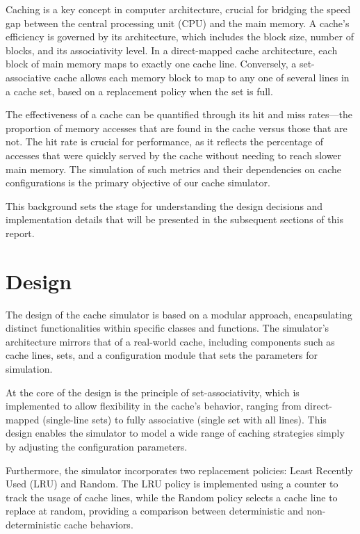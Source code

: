 \documentclass[12pt]{article}
\begin{document}
Caching is a key concept in computer architecture, crucial for bridging the speed gap between the central processing unit (CPU) and the main memory. A cache's efficiency is governed by its architecture, which includes the block size, number of blocks, and its associativity level. In a direct-mapped cache architecture, each block of main memory maps to exactly one cache line. Conversely, a set-associative cache allows each memory block to map to any one of several lines in a cache set, based on a replacement policy when the set is full.

The effectiveness of a cache can be quantified through its hit and miss rates—the proportion of memory accesses that are found in the cache versus those that are not. The hit rate is crucial for performance, as it reflects the percentage of accesses that were quickly served by the cache without needing to reach slower main memory. The simulation of such metrics and their dependencies on cache configurations is the primary objective of our cache simulator.

This background sets the stage for understanding the design decisions and implementation details that will be presented in the subsequent sections of this report.

\section{Design}

The design of the cache simulator is based on a modular approach, encapsulating distinct functionalities within specific classes and functions. The simulator's architecture mirrors that of a real-world cache, including components such as cache lines, sets, and a configuration module that sets the parameters for simulation.

At the core of the design is the principle of set-associativity, which is implemented to allow flexibility in the cache's behavior, ranging from direct-mapped (single-line sets) to fully associative (single set with all lines). This design enables the simulator to model a wide range of caching strategies simply by adjusting the configuration parameters.

\newpage
\vspace*{1cm}
Furthermore, the simulator incorporates two replacement policies: Least Recently Used (LRU) and Random. The LRU policy is implemented using a counter to track the usage of cache lines, while the Random policy selects a cache line to replace at random, providing a comparison between deterministic and non-deterministic cache behaviors.
\end{document}

